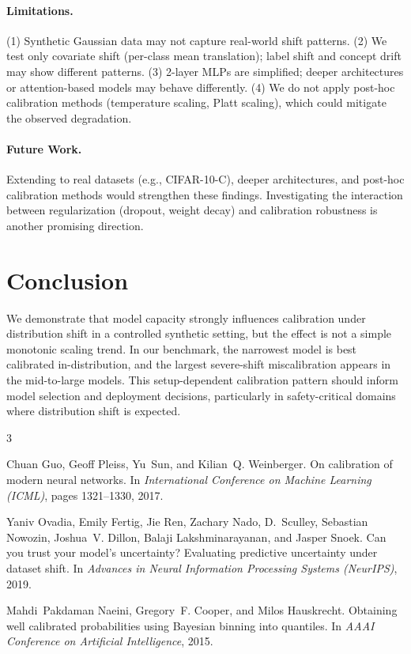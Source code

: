 \documentclass[11pt,a4paper]{article}
\begin{document}
\paragraph{Limitations.}
(1) Synthetic Gaussian data may not capture real-world shift patterns.
(2) We test only covariate shift (per-class mean translation); label shift and concept drift may show different patterns.
(3) 2-layer MLPs are simplified; deeper architectures or attention-based models may behave differently.
(4) We do not apply post-hoc calibration methods (temperature scaling, Platt scaling), which could mitigate the observed degradation.

\paragraph{Future Work.}
Extending to real datasets (e.g., CIFAR-10-C), deeper architectures, and post-hoc calibration methods would strengthen these findings.
Investigating the interaction between regularization (dropout, weight decay) and calibration robustness is another promising direction.

\section{Conclusion}

We demonstrate that model capacity strongly influences calibration under distribution shift in a controlled synthetic setting, but the effect is not a simple monotonic scaling trend.
In our benchmark, the narrowest model is best calibrated in-distribution, and the largest severe-shift miscalibration appears in the mid-to-large models.
This setup-dependent calibration pattern should inform model selection and deployment decisions, particularly in safety-critical domains where distribution shift is expected.


\begin{thebibliography}{3}

Chuan Guo, Geoff Pleiss, Yu~Sun, and Kilian~Q. Weinberger.
\newblock On calibration of modern neural networks.
\newblock In \emph{International Conference on Machine Learning (ICML)}, pages 1321--1330, 2017.

Yaniv Ovadia, Emily Fertig, Jie Ren, Zachary Nado, D.~Sculley, Sebastian Nowozin, Joshua~V. Dillon, Balaji Lakshminarayanan, and Jasper Snoek.
\newblock Can you trust your model's uncertainty? {E}valuating predictive uncertainty under dataset shift.
\newblock In \emph{Advances in Neural Information Processing Systems (NeurIPS)}, 2019.

Mahdi~Pakdaman Naeini, Gregory~F. Cooper, and Milos Hauskrecht.
\newblock Obtaining well calibrated probabilities using {B}ayesian binning into quantiles.
\newblock In \emph{AAAI Conference on Artificial Intelligence}, 2015.

\end{thebibliography}
\end{document}
